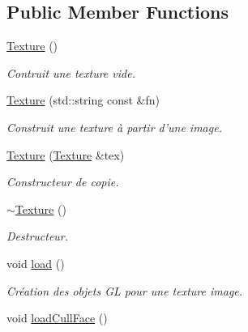 \subsection*{Public Member Functions}
\begin{DoxyCompactItemize}
\item 
\hypertarget{classTexture_a6c275e3f186675ff6ed73ccf970e552f}{\hyperlink{classTexture_a6c275e3f186675ff6ed73ccf970e552f}{Texture} ()}\label{classTexture_a6c275e3f186675ff6ed73ccf970e552f}

\begin{DoxyCompactList}\small\item\em Contruit une texture vide. \end{DoxyCompactList}\item 
\hypertarget{classTexture_a20743f514b11d6de3ee3a2517fc36c1f}{\hyperlink{classTexture_a20743f514b11d6de3ee3a2517fc36c1f}{Texture} (std\-::string const \&fn)}\label{classTexture_a20743f514b11d6de3ee3a2517fc36c1f}

\begin{DoxyCompactList}\small\item\em Construit une texture à partir d'une image. \end{DoxyCompactList}\item 
\hypertarget{classTexture_abc7ef59dd742a585d2bd1a0c13a7b64f}{\hyperlink{classTexture_abc7ef59dd742a585d2bd1a0c13a7b64f}{Texture} (\hyperlink{classTexture}{Texture} \&tex)}\label{classTexture_abc7ef59dd742a585d2bd1a0c13a7b64f}

\begin{DoxyCompactList}\small\item\em Constructeur de copie. \end{DoxyCompactList}\item 
\hypertarget{classTexture_a09c4bcb7462f64c1d20fa69dba3cee8a}{\hyperlink{classTexture_a09c4bcb7462f64c1d20fa69dba3cee8a}{$\sim$\-Texture} ()}\label{classTexture_a09c4bcb7462f64c1d20fa69dba3cee8a}

\begin{DoxyCompactList}\small\item\em Destructeur. \end{DoxyCompactList}\item 
\hypertarget{classTexture_ad3a36458f5ccd281b964ad1b2b4f92db}{void \hyperlink{classTexture_ad3a36458f5ccd281b964ad1b2b4f92db}{load} ()}\label{classTexture_ad3a36458f5ccd281b964ad1b2b4f92db}

\begin{DoxyCompactList}\small\item\em Création des objets G\-L pour une texture image. \end{DoxyCompactList}\item 
\hypertarget{classTexture_a460d3f86d1add69bd0c81623865b990a}{void \hyperlink{classTexture_a460d3f86d1add69bd0c81623865b990a}{load\-Cull\-Face} ()}\label{classTexture_a460d3f86d1add69bd0c81623865b990a}


\end{DoxyCompactItemize}
